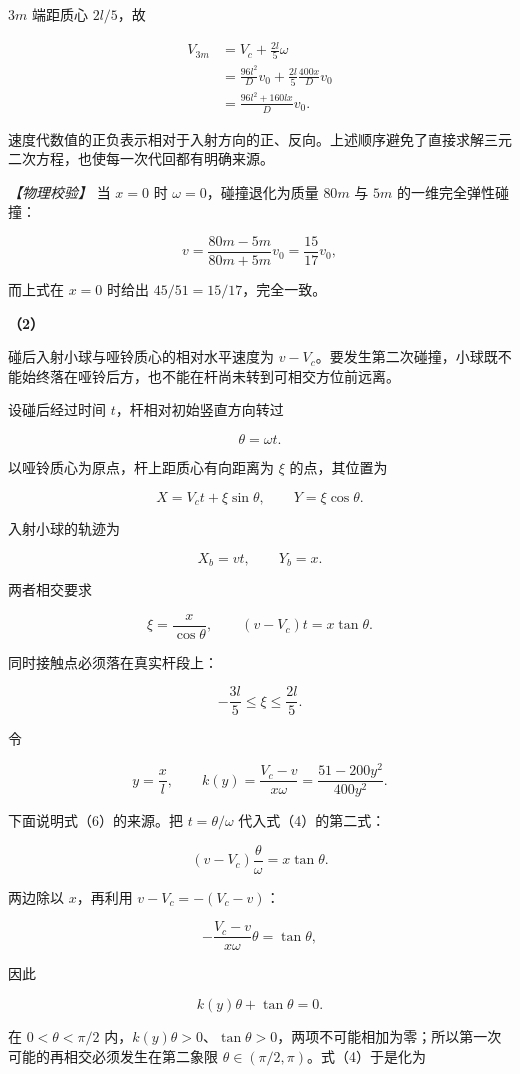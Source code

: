 \documentclass[12pt,a4paper,UTF8]{ctexart}
\begin{document}
\(3m\) 端距质心 \(2l/5\)，故

\[\begin{aligned}
V_{3m}
&=V_c+\frac{2l}{5}\omega\\
&=\frac{96l^2}{D}v_0
+\frac{2l}{5}\frac{400x}{D}v_0\\
&=\boxed{\frac{96l^2+160lx}{D}v_0}.
\end{aligned}\]

速度代数值的正负表示相对于入射方向的正、反向。上述顺序避免了直接求解三元二次方程，也使每一次代回都有明确来源。

\emph{【物理校验】} 当 \(x=0\) 时 \(\omega=0\)，碰撞退化为质量 \(80m\)
与 \(5m\) 的一维完全弹性碰撞：

\[v=\frac{80m-5m}{80m+5m}v_0=\frac{15}{17}v_0,\]

而上式在 \(x=0\) 时给出 \(45/51=15/17\)，完全一致。

\textbf{（2）}

碰后入射小球与哑铃质心的相对水平速度为
\(v-V_c\)。要发生第二次碰撞，小球既不能始终落在哑铃后方，也不能在杆尚未转到可相交方位前远离。

设碰后经过时间 \(t\)，杆相对初始竖直方向转过

\[\theta=\omega t.\]

以哑铃质心为原点，杆上距质心有向距离为 \(\xi\) 的点，其位置为

\[X=V_ct+\xi\sin\theta,\qquad
Y=\xi\cos\theta.\]

入射小球的轨迹为

\[X_b=vt,\qquad Y_b=x.\]

两者相交要求

\[\xi=\frac{x}{\cos\theta},\qquad
(v-V_c)t=x\tan\theta. \tag{4}\]

同时接触点必须落在真实杆段上：

\[-\frac{3l}{5}\leq\xi\leq\frac{2l}{5}. \tag{5}\]

令

\[y=\frac{x}{l},\qquad
k(y)=\frac{V_c-v}{x\omega}
=\frac{51-200y^2}{400y^2}.\]

下面说明式（6）的来源。把 \(t=\theta/\omega\) 代入式（4）的第二式：

\[(v-V_c)\frac{\theta}{\omega}=x\tan\theta.\]

两边除以 \(x\)，再利用 \(v-V_c=-(V_c-v)\)：

\[-\frac{V_c-v}{x\omega}\theta=\tan\theta,\]

因此

\[k(y)\theta+\tan\theta=0.\]

在 \(0<\theta<\pi/2\)
内，\(k(y)\theta>0\)、\(\tan\theta>0\)，两项不可能相加为零；所以第一次可能的再相交必须发生在第二象限
\(\theta\in(\pi/2,\pi)\)。式（4）于是化为
\end{document}
